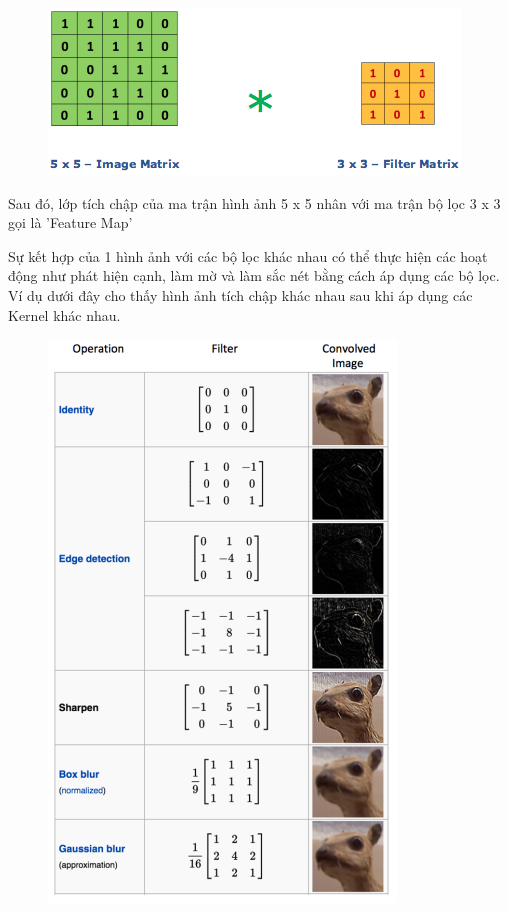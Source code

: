 \begin{figure}[H]  %
    \centering
    \includegraphics[width=0.75\linewidth]{Chapter2/CNN3.png}
    \label{fig:baitoan}
\end{figure}

Sau đó, lớp tích chập của ma trận hình ảnh 5 x 5 nhân với ma trận bộ lọc 3 x 3 gọi là 'Feature Map'

Sự kết hợp của 1 hình ảnh với các bộ lọc khác nhau có thể thực hiện các hoạt động như phát hiện cạnh, làm mờ và làm sắc nét bằng cách áp dụng các bộ lọc. Ví dụ dưới đây cho thấy hình ảnh tích chập khác nhau sau khi áp dụng các Kernel khác nhau.

\begin{figure}[H]  %
    \centering
    \includegraphics[width=0.75\linewidth]{Chapter2/CNN5.png}
    \label{fig:baitoan}
\end{figure}

